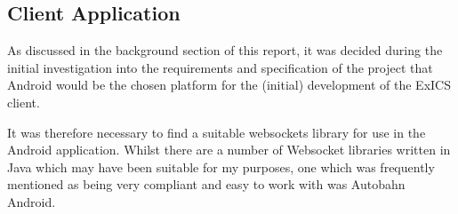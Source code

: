 \subsection{Client Application}

As discussed in the background section of this report, it was decided during the initial investigation into the requirements and specification of the project that Android would be the chosen platform for the (initial) development of the ExICS client.

It was therefore necessary to find a suitable websockets library for use in the Android application.  Whilst there are a number of Websocket libraries written in Java which may have been suitable for my purposes, one which was frequently mentioned as being very compliant and easy to work with was Autobahn Android. 